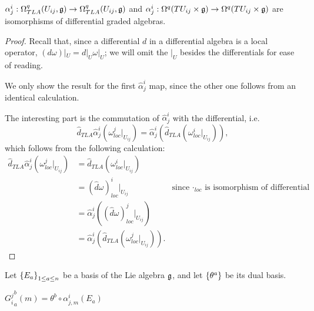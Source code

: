 \begin{theorem}
$\alpha^i_j: \Omega^q_{TLA}(U_{ij}, \mathfrak{g}) \to \Omega^q_{TLA}(U_{ij}, \mathfrak{g})$ and $\alpha^i_j: \Omega^q(TU_{ij}\times \mathfrak{g}) \to \Omega^q(TU_{ij}\times \mathfrak{g})$ are isomorphisms of differential graded algebras.
\end{theorem}
\begin{proof}
Recall that, since a differential $d$ in a differential algebra is a local operator, $(d\omega)|_U = d|_U \omega|_U$; we will omit the $|_U$ besides the differentials for ease of reading.

We only show the result for the first $\hat \alpha^i_j$ map, since the other one follows from an identical calculation.

The interesting part is the commutation of $\hat \alpha^i_j$ with the differential, i.e.
\begin{equation*}
    \hat d_{TLA} \hat \alpha^i_j(\omega^j_{loc}|_{U_{ij}}) = \hat \alpha^i_j(\hat d_{TLA} (\omega^i_{loc}|_{U_{ij}})),
\end{equation*} which follows from the following calculation:
\begin{align*}
    \hat d_{TLA} \hat \alpha^i_j(\omega^j_{loc}|_{U_{ij}})
    &= \hat d_{TLA} (\omega^i_{loc}|_{U_{ij}}) \\
    &= (\hat d \omega)^i_{loc}|_{U_{ij}} & \text{since $\cdot_{loc}$ is isomorphism of differential algebras}\\
    &= \hat \alpha^i_j((\hat d \omega)^j_{loc}|_{U_{ij}}) \\
    &= \hat \alpha^i_j(\hat d_{TLA} (\omega^j_{loc}|_{U_{ij}})).
\end{align*}
\end{proof}
\linea 

Let $\left\{ E_a \right\}_{1 \leq a \leq n}$ be a basis of the Lie algebra $\mathfrak{g}$, and let $\left\{ \theta^a \right\}$ be its dual basis.

\begin{definition}
    ${G_i^j}_a^b(m) = \theta^b \circ \alpha^i_{j, m}(E_a)$
\end{definition}

